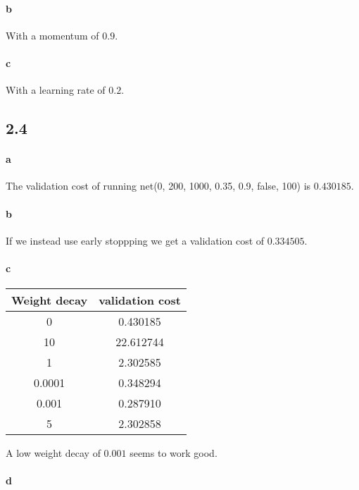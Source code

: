 \documentclass{article}
\begin{document}
\paragraph{b}

With a momentum of $0.9$.

\paragraph{c}

With a learning rate of $0.2$.

\subsection*{2.4}

\paragraph{a}

The validation cost of running net(0, 200, 1000, 0.35, 0.9, false, 100) is
$0.430185$.

\paragraph{b}

If we instead use early stoppping we get a validation cost of $0.334505$.

\paragraph{c}

\begin{tabular}{c | c}
  Weight decay & validation cost\\
  \hline
  0 & 0.430185\\
  \hline
  10 & 22.612744\\
  \hline
  1 & 2.302585\\
  \hline
  0.0001 & 0.348294\\
  \hline
  0.001 & 0.287910\\
  \hline
  5 & 2.302858\\
\end{tabular}

A low weight decay of $0.001$ seems to work good.

\paragraph{d}
\end{document}
